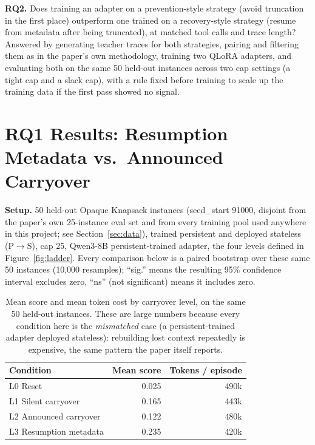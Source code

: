 \documentclass[11pt,a4paper]{article}
\newcommand{\cell}[1]{\textbf{#1}}
\begin{document}
\textbf{RQ2.} Does training an adapter on a prevention-style strategy (avoid truncation in the
first place) outperform one trained on a recovery-style strategy (resume from metadata after
being truncated), at matched tool calls and trace length? Answered by generating teacher traces
for both strategies, pairing and filtering them as in the paper's own methodology, training two
QLoRA adapters, and evaluating both on the same 50 held-out instances across two cap settings (a
tight cap and a slack cap), with a rule fixed before training to scale up the training data if
the first pass showed no signal.

\section{RQ1 Results: Resumption Metadata vs.\ Announced Carryover}
\label{sec:rq1}

\textbf{Setup.} 50 held-out Opaque Knapsack instances (seed\_start 91000, disjoint from the
paper's own 25-instance eval set and from every training pool used anywhere in this project;
see Section~\ref{sec:data}), trained persistent and deployed stateless (P$\to$S), cap 25,
Qwen3-8B persistent-trained adapter, the four levels defined in Figure~\ref{fig:ladder}. Every
comparison below is a paired bootstrap over these same 50 instances (10,000 resamples); ``sig.''
means the resulting 95\% confidence interval excludes zero, ``ns'' (not significant) means it
includes zero.

\begin{table}[H]
\centering
\small
\begin{tabular}{@{}lrr@{}}
\toprule
\cell{Condition} & \cell{Mean score} & \cell{Tokens / episode} \\
\midrule
L0 Reset & 0.025 & 490k \\
L1 Silent carryover & 0.165 & 443k \\
L2 Announced carryover & 0.122 & 480k \\
L3 Resumption metadata & 0.235 & 420k \\
\bottomrule
\end{tabular}
\caption{Mean score and mean token cost by carryover level, on the same 50 held-out instances.
These are large numbers because every condition here is the \emph{mismatched} case (a
persistent-trained adapter deployed stateless): rebuilding lost context repeatedly is expensive,
the same pattern the paper itself reports.}
\label{tab:ladder-scores}
\end{table}
\end{document}
